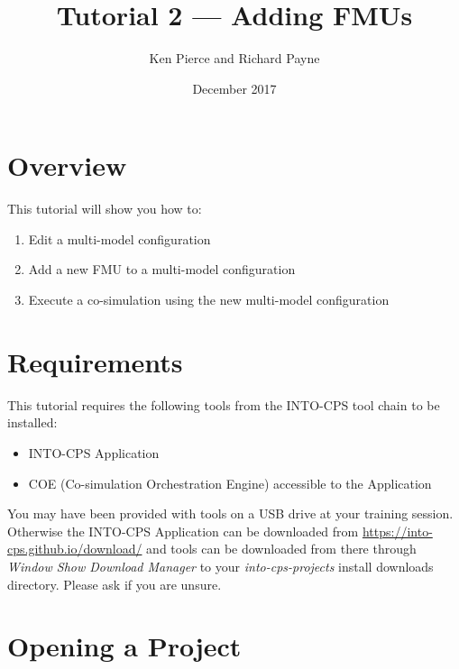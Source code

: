 \documentclass[11pt,a4paper]{../tutorial}
\title{Tutorial 2 --- Adding FMUs}
\date{December 2017}
\author{Ken Pierce and Richard Payne}
\begin{document}
\section*{Overview}

This tutorial will show you how to:

\begin{enumerate}[noitemsep]
\item Edit a multi-model configuration
\item Add a new FMU to a multi-model configuration
\item Execute a co-simulation using the new multi-model configuration
\end{enumerate}

\section*{Requirements}

This tutorial requires the following tools from the INTO-CPS tool chain to be installed:

\begin{itemize}[noitemsep]
\item INTO-CPS Application
\item COE (Co-simulation Orchestration Engine) accessible to the Application
\end{itemize}

You may have been provided with tools on a USB drive at your training session. Otherwise the INTO-CPS Application can be downloaded from \url{https://into-cps.github.io/download/} and tools can be downloaded from there through \emph{Window \menusep Show Download Manager} to your \emph{into-cps-projects} install downloads directory. Please ask if you are unsure.


\section{Opening a Project}
\end{document}
